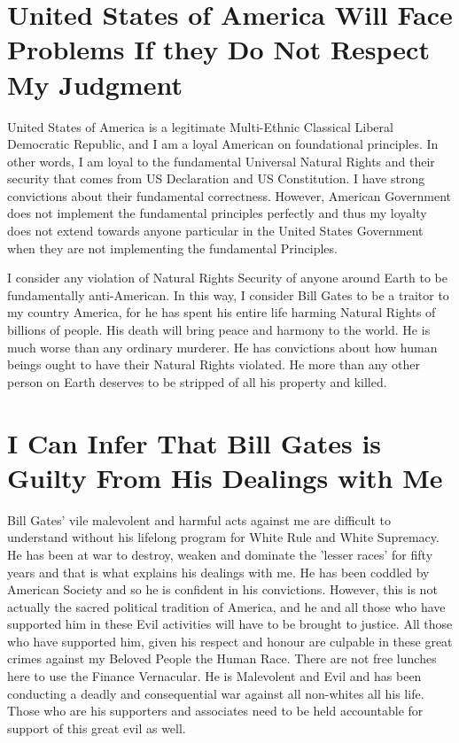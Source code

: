 \documentclass{amsart}
\begin{document}
\section{United States of America Will Face Problems If they Do Not Respect My Judgment}

United States of America is a legitimate Multi-Ethnic Classical Liberal Democratic Republic, and I am a loyal American on foundational principles.  In other words, I am loyal to the fundamental Universal Natural Rights and their security that comes from US Declaration and US Constitution.  I have strong convictions about their fundamental correctness.  However, American Government does not implement the fundamental principles perfectly and thus my loyalty does not extend towards anyone particular in the United States Government when they  are not implementing the fundamental Principles.

I consider any violation of Natural Rights Security of anyone around Earth to be fundamentally anti-American.  In this way, I consider Bill Gates to be a traitor to my country America, for he has spent his entire life harming Natural Rights of billions of people.  His death will bring peace and harmony to the world.  He is much worse than any ordinary murderer.  He has convictions about how human beings ought to have their Natural Rights violated.  He more than any other person on Earth deserves to be stripped of all his property and killed.

\section{I Can Infer That Bill Gates is Guilty From His Dealings with Me}

Bill Gates' vile malevolent and harmful acts against me are difficult to understand without his lifelong program for White Rule and White Supremacy.  He has been at war to destroy, weaken and dominate the 'lesser races' for fifty years and that is what explains his dealings with me.  He has been coddled by American Society and so he is confident in his convictions.  However, this is not actually the sacred political tradition of America, and he and all those who have supported him in these Evil activities will have to be brought to justice.  All those who have supported him, given his respect and honour are culpable in these great crimes against my Beloved People the Human Race.  There are not free lunches here to use the Finance Vernacular.  He is Malevolent and Evil and has been conducting a deadly and consequential war against all non-whites all his life.  Those who are his supporters and associates need to be held accountable for support of this great evil as well.
\end{document}
